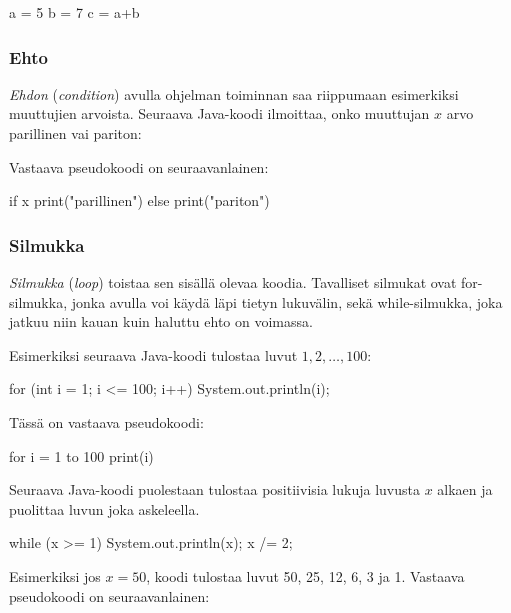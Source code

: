 \begin{code}
a = 5
b = 7
c = a+b
\end{code}

\subsubsection{Ehto}

\emph{Ehdon} (\emph{condition}) avulla ohjelman
toiminnan saa riippumaan esimerkiksi muuttujien arvoista.
Seuraava Java-koodi ilmoittaa, onko muuttujan $x$ arvo parillinen vai pariton:


Vastaava pseudokoodi on seuraavanlainen:

\begin{code}
if x%
    print("parillinen")
else
    print("pariton")
\end{code}

\subsubsection{Silmukka}

\emph{Silmukka} (\emph{loop}) toistaa sen sisällä olevaa koodia.
Tavalliset silmukat ovat for-silmukka,
jonka avulla voi käydä läpi tietyn lukuvälin,
sekä while-silmukka,
joka jatkuu niin kauan kuin haluttu ehto on voimassa.

Esimerkiksi seuraava Java-koodi tulostaa luvut $1,2,\dots,100$:

\begin{code}
for (int i = 1; i <= 100; i++) {
    System.out.println(i);
}
\end{code}

Tässä on vastaava pseudokoodi:

\begin{code}
for i = 1 to 100
    print(i)
\end{code}

Seuraava Java-koodi puolestaan tulostaa positiivisia lukuja luvusta $x$ alkaen
ja puolittaa luvun joka askeleella.

\begin{code}
while (x >= 1) {
    System.out.println(x);
    x /= 2;
}
\end{code}

Esimerkiksi jos $x=50$, koodi tulostaa luvut 50, 25, 12, 6, 3 ja 1.
Vastaava pseudokoodi on seuraavanlainen:

